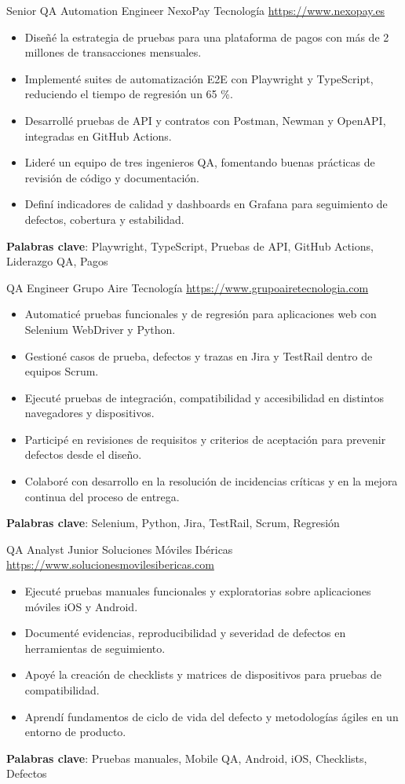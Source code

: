 \documentclass[a4paper, serif, 10pt]{moderncv}
\begin{document}
        {Senior QA Automation Engineer}
        {NexoPay Tecnología}
        {\url{https://www.nexopay.es}}
        {}
        {\begin{itemize}
\item Diseñé la estrategia de pruebas para una plataforma de pagos con más de 2 millones de transacciones mensuales.
\item Implementé suites de automatización E2E con Playwright y TypeScript, reduciendo el tiempo de regresión un 65 \%.
\item Desarrollé pruebas de API y contratos con Postman, Newman y OpenAPI, integradas en GitHub Actions.
\item Lideré un equipo de tres ingenieros QA, fomentando buenas prácticas de revisión de código y documentación.
\item Definí indicadores de calidad y dashboards en Grafana para seguimiento de defectos, cobertura y estabilidad.
\end{itemize}
\textbf{Palabras clave}: Playwright, TypeScript, Pruebas de API, GitHub Actions, Liderazgo QA, Pagos}

        {QA Engineer}
        {Grupo Aire Tecnología}
        {\url{https://www.grupoairetecnologia.com}}
        {}
        {\begin{itemize}
\item Automaticé pruebas funcionales y de regresión para aplicaciones web con Selenium WebDriver y Python.
\item Gestioné casos de prueba, defectos y trazas en Jira y TestRail dentro de equipos Scrum.
\item Ejecuté pruebas de integración, compatibilidad y accesibilidad en distintos navegadores y dispositivos.
\item Participé en revisiones de requisitos y criterios de aceptación para prevenir defectos desde el diseño.
\item Colaboré con desarrollo en la resolución de incidencias críticas y en la mejora continua del proceso de entrega.
\end{itemize}
\textbf{Palabras clave}: Selenium, Python, Jira, TestRail, Scrum, Regresión}

        {QA Analyst Junior}
        {Soluciones Móviles Ibéricas}
        {\url{https://www.solucionesmovilesibericas.com}}
        {}
        {\begin{itemize}
\item Ejecuté pruebas manuales funcionales y exploratorias sobre aplicaciones móviles iOS y Android.
\item Documenté evidencias, reproducibilidad y severidad de defectos en herramientas de seguimiento.
\item Apoyé la creación de checklists y matrices de dispositivos para pruebas de compatibilidad.
\item Aprendí fundamentos de ciclo de vida del defecto y metodologías ágiles en un entorno de producto.
\end{itemize}
\textbf{Palabras clave}: Pruebas manuales, Mobile QA, Android, iOS, Checklists, Defectos}
\end{document}
